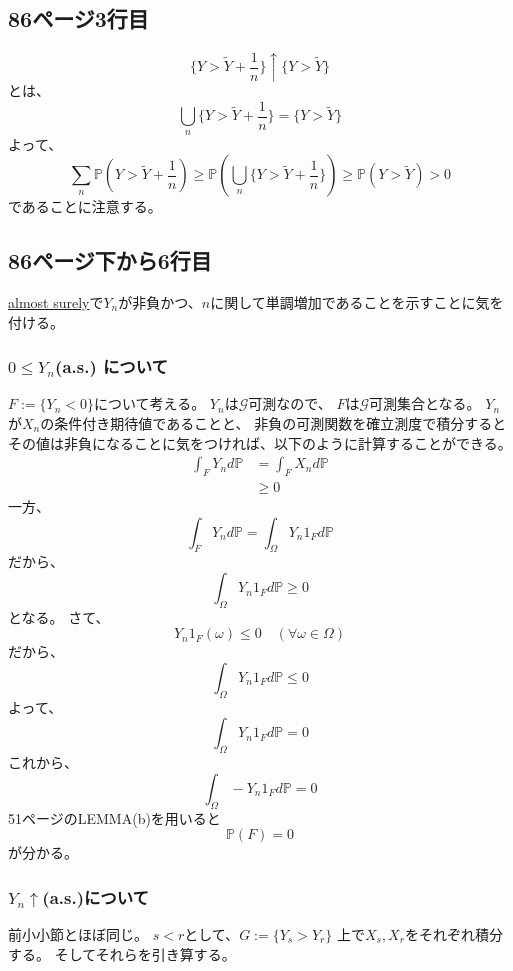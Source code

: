 \documentclass[11pt, a4paper]{jsarticle}
\theoremstyle{definition}
\newcommand{\PP}{{\mathbb{P}}} %
\begin{document}
    \subsection{86ページ3行目}
      \[
        \{ Y > \tilde{Y} + \frac{1}{n} \} \uparrow
        \{ Y > \tilde{Y}\}
      \]
      とは、
      \[
        \bigcup_{n}\{ Y > \tilde{Y} + \frac{1}{n} \} =
        \{ Y > \tilde{Y}\}
      \]
      よって、
      \[
        \sum_n \PP(Y > \tilde{Y} + \frac{1}{n})
        \ge
        \PP \left(\bigcup_{n}\{ Y > \tilde{Y} + \frac{1}{n} \} \right)
        \ge
        \PP(Y > \tilde{Y})
        > 0
      \]
      であることに注意する。

    \subsection{86ページ下から6行目}
      \underline{almost surely}で$Y_n$が非負かつ、$n$に関して単調増加であることを示すことに気を付ける。
      \subsubsection{$0 \leq Y_n$(a.s.) について}
        $F := \{ Y_n < 0 \}$について考える。
        $Y_n$は$\mathcal{G}$可測なので、
        $F$は$\mathcal{G}$可測集合となる。
        $Y_n$が$X_n$の条件付き期待値であることと、
        非負の可測関数を確立測度で積分するとその値は非負になることに気をつければ、以下のように計算することができる。
        \begin{align*}
          \int_F Y_n d\PP &= \int_F X_n d\PP \\
          &\ge 0
        \end{align*}
        一方、
        \[
          \int_F Y_n d\PP = \int_{\Omega} Y_n 1_F d\PP
        \]
        だから、
        \[
          \int_{\Omega} Y_n 1_F d\PP \ge 0
        \]
        となる。
        さて、
        \[
          Y_n 1_F(\omega) \leq 0 \quad (\forall \omega \in \Omega)
        \]
        だから、
        \[
          \int_{\Omega} Y_n 1_F d\PP \leq 0
        \]
        よって、
        \[
          \int_{\Omega} Y_n 1_F d\PP = 0
        \]
        これから、
        \[
          \int_{\Omega} -Y_n 1_F d\PP = 0
        \]
        51ページのLEMMA(b)を用いると
        \[
          \PP(F) = 0
        \]
        が分かる。

      \subsubsection{$Y_n \uparrow$(a.s.)について}
        前小小節とほぼ同じ。
        $s < r$として、$G := \{ Y_s > Y_r \}$
        上で$X_s,X_r$をそれぞれ積分する。
        そしてそれらを引き算する。
\end{document}
